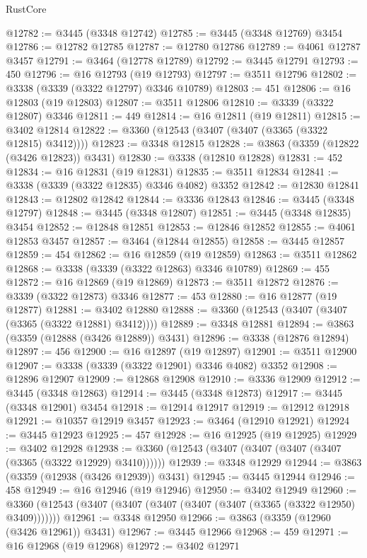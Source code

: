 \begin{lexlean}{RustCore}
\begin{coremodule}
@12782 := @3445 (@3348 @12742)
@12785 := @3445 (@3348 @12769) @3454
@12786 := @12782 @12785
@12787 := @12780 @12786
@12789 := @4061 @12787 @3457
@12791 := @3464 (@12778 @12789)
@12792 := @3445 @12791
@12793 := 450
@12796 := @16 @12793 (@19 @12793)
@12797 := @3511 @12796
@12802 := @3338 (@3339 (@3322 @12797) @3346 @10789)
@12803 := 451
@12806 := @16 @12803 (@19 @12803)
@12807 := @3511 @12806
@12810 := @3339 (@3322 @12807) @3346
@12811 := 449
@12814 := @16 @12811 (@19 @12811)
@12815 := @3402 @12814
@12822 := @3360 (@12543 (@3407 (@3407 (@3365 (@3322 @12815) @3412))))
@12823 := @3348 @12815
@12828 := @3863 (@3359 (@12822 (@3426 @12823)) @3431)
@12830 := @3338 (@12810 @12828)
@12831 := 452
@12834 := @16 @12831 (@19 @12831)
@12835 := @3511 @12834
@12841 := @3338 (@3339 (@3322 @12835) @3346 @4082) @3352
@12842 := @12830 @12841
@12843 := @12802 @12842
@12844 := @3336 @12843
@12846 := @3445 (@3348 @12797)
@12848 := @3445 (@3348 @12807)
@12851 := @3445 (@3348 @12835) @3454
@12852 := @12848 @12851
@12853 := @12846 @12852
@12855 := @4061 @12853 @3457
@12857 := @3464 (@12844 @12855)
@12858 := @3445 @12857
@12859 := 454
@12862 := @16 @12859 (@19 @12859)
@12863 := @3511 @12862
@12868 := @3338 (@3339 (@3322 @12863) @3346 @10789)
@12869 := 455
@12872 := @16 @12869 (@19 @12869)
@12873 := @3511 @12872
@12876 := @3339 (@3322 @12873) @3346
@12877 := 453
@12880 := @16 @12877 (@19 @12877)
@12881 := @3402 @12880
@12888 := @3360 (@12543 (@3407 (@3407 (@3365 (@3322 @12881) @3412))))
@12889 := @3348 @12881
@12894 := @3863 (@3359 (@12888 (@3426 @12889)) @3431)
@12896 := @3338 (@12876 @12894)
@12897 := 456
@12900 := @16 @12897 (@19 @12897)
@12901 := @3511 @12900
@12907 := @3338 (@3339 (@3322 @12901) @3346 @4082) @3352
@12908 := @12896 @12907
@12909 := @12868 @12908
@12910 := @3336 @12909
@12912 := @3445 (@3348 @12863)
@12914 := @3445 (@3348 @12873)
@12917 := @3445 (@3348 @12901) @3454
@12918 := @12914 @12917
@12919 := @12912 @12918
@12921 := @10357 @12919 @3457
@12923 := @3464 (@12910 @12921)
@12924 := @3445 @12923
@12925 := 457
@12928 := @16 @12925 (@19 @12925)
@12929 := @3402 @12928
@12938 := @3360 (@12543 (@3407 (@3407 (@3407 (@3407 (@3365 (@3322 @12929) @3410))))))
@12939 := @3348 @12929
@12944 := @3863 (@3359 (@12938 (@3426 @12939)) @3431)
@12945 := @3445 @12944
@12946 := 458
@12949 := @16 @12946 (@19 @12946)
@12950 := @3402 @12949
@12960 := @3360 (@12543 (@3407 (@3407 (@3407 (@3407 (@3407 (@3365 (@3322 @12950) @3409)))))))
@12961 := @3348 @12950
@12966 := @3863 (@3359 (@12960 (@3426 @12961)) @3431)
@12967 := @3445 @12966
@12968 := 459
@12971 := @16 @12968 (@19 @12968)
@12972 := @3402 @12971

\end{coremodule}
\end{lexlean}
